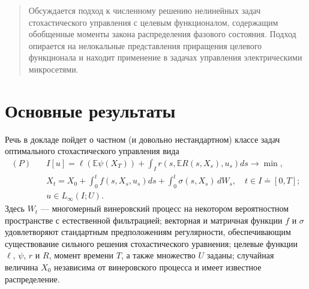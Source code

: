 
\maketitle

\begin{abstract}

Обсуждается подход к численному решению нелинейных задач стохастического управления с целевым функционалом, содержащим обобщенные моменты закона распределения фазового состояния. Подход опирается на нелокальные представления приращения целевого функционала и находит применение в задачах управления электрическими микросетями.

\end{abstract}

\section{Основные результаты} %

Речь в докладе пойдет о частном (и довольно нестандартном) классе задач оптимального стохастического управления вида
\begin{align*}
  (P) \quad & I[u] = \ell(\mathbb E \psi(X_T)) + \int_I r(s,\mathbb E R(s, X_s), u_s)d s  \to \min,\\
    &X_t = X_0 + \int_0^t f(s, X_s, u_s) d s + \int_0^t\sigma(s, X_s) \, d W_s, \quad t \in I \doteq [0,T];\\
    & u \in L_\infty(I; U).
\end{align*}
Здесь $W_t$ --- многомерный винеровский процесс на некотором вероятностном пространстве с естественной фильтрацией; векторная и матричная функции $f$ и $\sigma$ удовлетворяют стандартным предположениям регулярности, обеспечивающим существование сильного решения стохастического уравнения; целевые функции $\ell$, $\psi$, $r$ и $R$, момент времени $T$, а также множество $U$ заданы; случайная величина $X_0$ независима от винеровского процесса и имеет известное распределение. 

